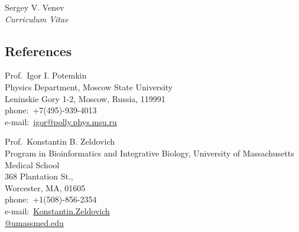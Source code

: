 \documentclass[10pt]{article}
\begin{document}
\begin{cv}{Sergey V. Venev\\{\large \itshape Curriculum Vitae}}
%     
%     



\subsection*{References}
\noindent\makebox[\linewidth]{\rule{\textwidth}{0.5pt}}
\vspace{0.1\baselineskip}
\begin{paracol}{3}

    Prof.\ Igor I. Potemkin\\
    Physics Department, Moscow State University\\
    Leninskie Gory 1-2, Moscow, Russia, 119991\\
    phone:\ +7(495)-939-4013\\
    e-mail:\ \href{mailto:igor@polly.phys.msu.ru}{igor\textrm{@}polly.phys.msu.ru}

\switchcolumn

    Prof.\ Konstantin B. Zeldovich\\
    Program in Bioinformatics and Integrative Biology, University of Massachusetts Medical School\\
    368 Plantation St.,\\ Worcester, MA, 01605\\
    phone:\ +1(508)-856-2354\\
    e-mail:\ \href{mailto:Konstantin.Zeldovich@umassmed.edu}{Konstantin.Zeldovich\\\textrm{@}umassmed.edu}





\end{paracol}




\end{cv}
\end{document}
